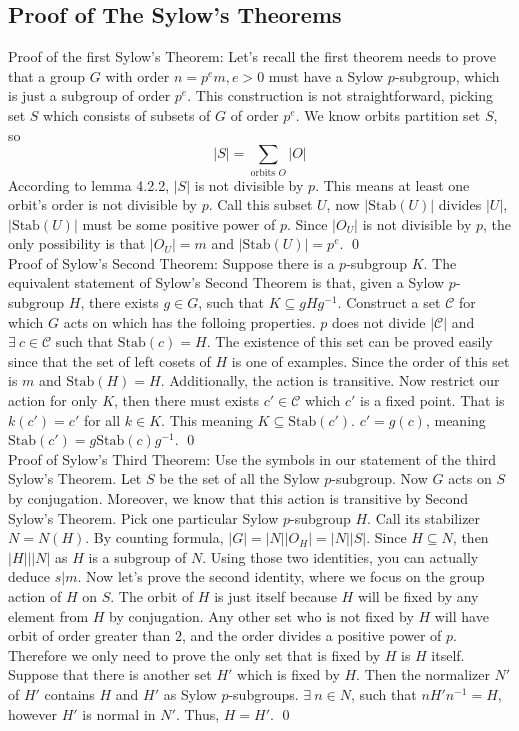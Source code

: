 \documentclass{article}
\begin{document}
\subsection{Proof of The Sylow's Theorems}
Proof of the first Sylow's Theorem: Let's recall the first theorem needs to prove that a group $G$ with order $n = p^e m, e > 0$ must have a Sylow $p$-subgroup, which 
is just a subgroup of order $p^e$. This construction is not straightforward, picking set $S$ which consists of subsets of $G$ of order $p^e$. We know orbits partition set
$S$, so
$$
|S| = \sum_{\text{orbits } O} |O|
$$
According to lemma 4.2.2, $|S|$ is not divisible by $p$. This means at least one orbit's order is not divisible by $p$. Call this subset $U$, now $|\text{Stab}(U)|$ divides $|U|$, $|\text{Stab}(U)|$ 
must be some positive power of $p$. Since $|O_U|$ is not divisible by $p$, the only possibility is that $|O_U| = m$ and $|\text{Stab}(U)| = p^e$. \qed\\
Proof of Sylow's Second Theorem: Suppose there is a $p$-subgroup $K$. The equivalent statement of Sylow's Second Theorem is that, given a Sylow $p$-subgroup $H$, there exists $g \in G$, such that $K \subseteq g H g^{-1}$.
Construct a set $\mathcal{C}$ for which $G$ acts on which has the folloing properties. $p$ does not divide $|\mathcal{C}|$ and $\exists\ c \in \mathcal{C}$ such that $\text{Stab}(c) = H$. The existence of this set can be 
proved easily since that the set of left cosets of $H$ is one of examples. Since the order of this set is $m$ and $\text{Stab}(H) = H$. Additionally, the action is transitive.
Now restrict our action for only $K$, then there must exists $c' \in \mathcal{C}$ which $c'$ is a fixed point. That is $k(c') = c'$ for all $k \in K$. This meaning $K \subseteq \text{Stab}(c')$. $c' = g(c)$, meaning $\text{Stab}(c') = g \text{Stab}(c) g^{-1}$.
\qed\\
Proof of Sylow's Third Theorem: Use the symbols in our statement of the third Sylow's Theorem. Let $S$ be the set of all the Sylow $p$-subgroup. Now $G$ acts on $S$ by conjugation. Moreover, we know that this action is transitive by 
Second Sylow's Theorem. Pick one particular Sylow $p$-subgroup $H$. Call its stabilizer $N = N(H)$. By counting formula, $|G| = |N||O_{H}| = |N||S|$. Since $H \subseteq N$, then $|H| | |N|$ as $H$ is a subgroup of $N$. Using those two identities, you can actually
deduce $s | m$. Now let's prove the second identity, where we focus on the group action of $H$ on $S$. The orbit of $H$ is just itself because $H$ will be fixed by any element from $H$ by conjugation. Any other set who is not fixed by $H$ will have orbit of order 
greater than $2$, and the order divides a positive power of $p$. Therefore we only need to prove the only set that is fixed by $H$ is $H$ itself. Suppose that there is another set $H'$ which is fixed by $H$. 
Then the normalizer $N'$ of $H'$ contains $H$ and $H'$ as Sylow $p$-subgroups. $\exists\ n \in N$, such that $n H' n^{-1} = H$, however $H'$ is normal in $N'$. Thus, $H = H'$. \qed
\end{document}
